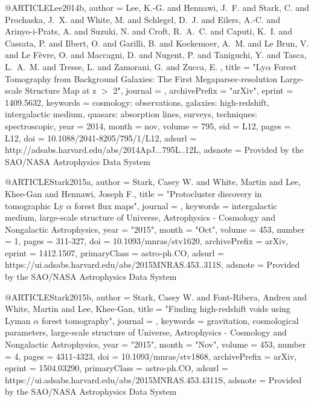 \documentclass{aa}
\begin{document}
{{{{{{{{{{{{{{@ARTICLE{Lee2014b,
   author = {{Lee}, K.-G. and {Hennawi}, J.~F. and {Stark}, C. and {Prochaska}, J.~X. and 
	{White}, M. and {Schlegel}, D.~J. and {Eilers}, A.-C. and {Arinyo-i-Prats}, A. and 
	{Suzuki}, N. and {Croft}, R.~A.~C. and {Caputi}, K.~I. and {Cassata}, P. and 
	{Ilbert}, O. and {Garilli}, B. and {Koekemoer}, A.~M. and {Le Brun}, V. and 
	{Le F{\`e}vre}, O. and {Maccagni}, D. and {Nugent}, P. and {Taniguchi}, Y. and 
	{Tasca}, L.~A.~M. and {Tresse}, L. and {Zamorani}, G. and {Zucca}, E.
	},
    title = "{Ly{$\alpha$} Forest Tomography from Background Galaxies: The First Megaparsec-resolution Large-scale Structure Map at z $\gt$ 2}",
  journal = {\apjl},
archivePrefix = "arXiv",
   eprint = {1409.5632},
 keywords = {cosmology: observations, galaxies: high-redshift, intergalactic medium, quasars: absorption lines, surveys, techniques: spectroscopic},
     year = 2014,
    month = nov,
   volume = 795,
      eid = {L12},
    pages = {L12},
      doi = {10.1088/2041-8205/795/1/L12},
   adsurl = {http://adsabs.harvard.edu/abs/2014ApJ...795L..12L},
  adsnote = {Provided by the SAO/NASA Astrophysics Data System}
}

@ARTICLE{Stark2015a,
       author = {{Stark}, Casey W. and {White}, Martin and {Lee}, Khee-Gan and
         {Hennawi}, Joseph F.},
        title = "{Protocluster discovery in tomographic Ly {\ensuremath{\alpha}} forest flux maps}",
      journal = {\mnras},
     keywords = {intergalactic medium, large-scale structure of Universe, Astrophysics - Cosmology and Nongalactic Astrophysics},
         year = "2015",
        month = "Oct",
       volume = {453},
       number = {1},
        pages = {311-327},
          doi = {10.1093/mnras/stv1620},
archivePrefix = {arXiv},
       eprint = {1412.1507},
 primaryClass = {astro-ph.CO},
       adsurl = {https://ui.adsabs.harvard.edu/abs/2015MNRAS.453..311S},
      adsnote = {Provided by the SAO/NASA Astrophysics Data System}
}

@ARTICLE{Stark2015b,
       author = {{Stark}, Casey W. and {Font-Ribera}, Andreu and {White}, Martin and
         {Lee}, Khee-Gan},
        title = "{Finding high-redshift voids using Lyman {\ensuremath{\alpha}} forest tomography}",
      journal = {\mnras},
     keywords = {gravitation, cosmological parameters, large-scale structure of Universe, Astrophysics - Cosmology and Nongalactic Astrophysics},
         year = "2015",
        month = "Nov",
       volume = {453},
       number = {4},
        pages = {4311-4323},
          doi = {10.1093/mnras/stv1868},
archivePrefix = {arXiv},
       eprint = {1504.03290},
 primaryClass = {astro-ph.CO},
       adsurl = {https://ui.adsabs.harvard.edu/abs/2015MNRAS.453.4311S},
      adsnote = {Provided by the SAO/NASA Astrophysics Data System}
}

}}}}}}}}}}}}}}
\end{document}
